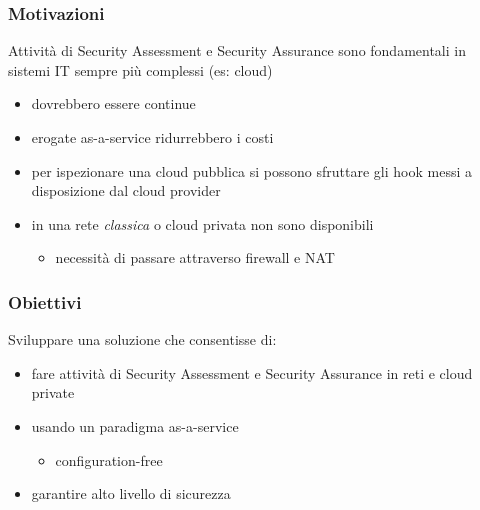 \begin{frame}
    \frametitle{Motivazioni}
    
    Attività di \alert{Security Assessment} e \alert{Security Assurance} sono 
    fondamentali in sistemi IT sempre più \alert{complessi} (es: cloud)
    \begin{itemize}
        \item dovrebbero essere \alert{continue}
        \item erogate \alert{as-a-service} ridurrebbero i costi
    \end{itemize}
			
	\begin{itemize}
		\item per ispezionare una cloud pubblica si possono sfruttare
		      gli \alert{hook} messi a disposizione dal cloud provider
		\item in una rete \textit{classica} o cloud privata non sono disponibili
		      		      		      
		      \begin{itemize}
		      	\item necessità di passare attraverso \alert{firewall} e \alert{NAT}
		      \end{itemize}
	\end{itemize}
			
\end{frame}

\begin{frame}
	\frametitle{Obiettivi}
	Sviluppare una soluzione che consentisse di:
	\begin{itemize}
		\item fare attività di \alert{Security Assessment} e \alert{Security Assurance}
		in reti e cloud private
		\item usando un paradigma \alert{as-a-service}
		\begin{itemize}
			\item configuration-free
		\end{itemize}
		\item garantire alto livello di sicurezza
	\end{itemize}
\end{frame}

